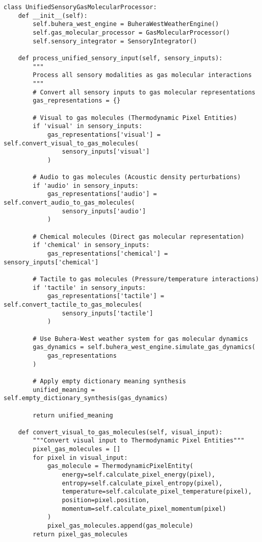 \documentclass[11pt,a4paper]{article}
\begin{document}
\begin{lstlisting}[style=pythonstyle, caption=Buhera-West Gas Molecular Sensory Integration]
class UnifiedSensoryGasMolecularProcessor:
    def __init__(self):
        self.buhera_west_engine = BuheraWestWeatherEngine()
        self.gas_molecular_processor = GasMolecularProcessor()
        self.sensory_integrator = SensoryIntegrator()
        
    def process_unified_sensory_input(self, sensory_inputs):
        """
        Process all sensory modalities as gas molecular interactions
        """
        # Convert all sensory inputs to gas molecular representations
        gas_representations = {}
        
        # Visual to gas molecules (Thermodynamic Pixel Entities)
        if 'visual' in sensory_inputs:
            gas_representations['visual'] = self.convert_visual_to_gas_molecules(
                sensory_inputs['visual']
            )
        
        # Audio to gas molecules (Acoustic density perturbations)
        if 'audio' in sensory_inputs:
            gas_representations['audio'] = self.convert_audio_to_gas_molecules(
                sensory_inputs['audio']
            )
        
        # Chemical molecules (Direct gas molecular representation)
        if 'chemical' in sensory_inputs:
            gas_representations['chemical'] = sensory_inputs['chemical']
        
        # Tactile to gas molecules (Pressure/temperature interactions)
        if 'tactile' in sensory_inputs:
            gas_representations['tactile'] = self.convert_tactile_to_gas_molecules(
                sensory_inputs['tactile']
            )
        
        # Use Buhera-West weather system for gas molecular dynamics
        gas_dynamics = self.buhera_west_engine.simulate_gas_dynamics(
            gas_representations
        )
        
        # Apply empty dictionary meaning synthesis
        unified_meaning = self.empty_dictionary_synthesis(gas_dynamics)
        
        return unified_meaning
    
    def convert_visual_to_gas_molecules(self, visual_input):
        """Convert visual input to Thermodynamic Pixel Entities"""
        pixel_gas_molecules = []
        for pixel in visual_input:
            gas_molecule = ThermodynamicPixelEntity(
                energy=self.calculate_pixel_energy(pixel),
                entropy=self.calculate_pixel_entropy(pixel),
                temperature=self.calculate_pixel_temperature(pixel),
                position=pixel.position,
                momentum=self.calculate_pixel_momentum(pixel)
            )
            pixel_gas_molecules.append(gas_molecule)
        return pixel_gas_molecules
    

\end{lstlisting}
\end{document}
